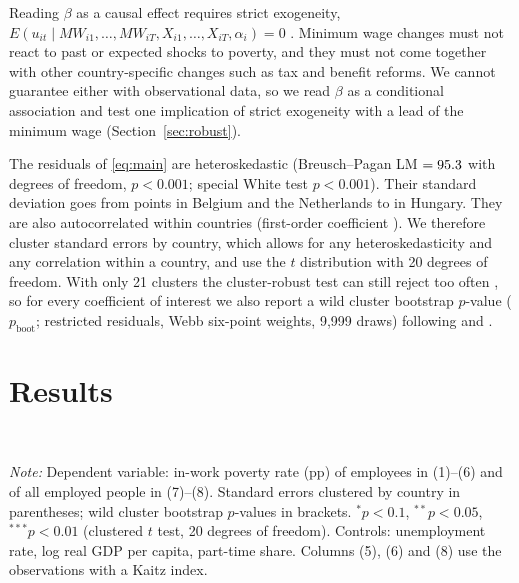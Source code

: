 \documentclass[10pt,a4paper]{article}
\newcommand{\pb}{p_{\text{boot}}}
\begin{document}
Reading $\beta$ as a causal effect requires strict exogeneity, $E(u_{it}\mid \mathit{MW}_{i1},\dots,\mathit{MW}_{iT}, X_{i1},\dots,X_{iT}, \alpha_i)=0$ \citep[ch.~13--14]{wooldridge2013}. Minimum wage changes must not react to past or expected shocks to poverty, and they must not come together with other country-specific changes such as tax and benefit reforms. We cannot guarantee either with observational data, so we read $\beta$ as a conditional association and test one implication of strict exogeneity with a lead of the minimum wage (Section~\ref{sec:robust}).

The residuals of \eqref{eq:main} are heteroskedastic (Breusch--Pagan LM $=95.3$ with \BpDf{} degrees of freedom, $p<0.001$; special White test $p<0.001$). Their standard deviation goes from \ResSdMin{} points in Belgium and the Netherlands to \ResSdMax{} in Hungary. They are also autocorrelated within countries (first-order coefficient \ArRho). We therefore cluster standard errors by country, which allows for any heteroskedasticity and any correlation within a country, and use the $t$ distribution with 20 degrees of freedom. With only 21 clusters the cluster-robust test can still reject too often \citep{cameron2015}, so for every coefficient of interest we also report a wild cluster bootstrap $p$-value ($\pb$; restricted residuals, Webb six-point weights, 9{,}999 draws) following \citet{cameron2008} and \citet{webb2023}.

\section{Results}

\begin{table}[t]
\centering\footnotesize
\caption{Minimum wage and in-work poverty: from pooled OLS to two-way fixed effects}\label{tab:main}
\setlength{\tabcolsep}{4.5pt}

\\[2pt]\parbox{0.96\textwidth}{\scriptsize\textit{Note:} Dependent variable: in-work poverty rate (pp) of employees in (1)--(6) and of all employed people in (7)--(8). Standard errors clustered by country in parentheses; wild cluster bootstrap $p$-values in brackets. $^{*}p<0.1$, $^{**}p<0.05$, $^{***}p<0.01$ (clustered $t$ test, 20 degrees of freedom). Controls: unemployment rate, log real GDP per capita, part-time share. Columns (5), (6) and (8) use the \NKaitz{} observations with a Kaitz index.}
\end{table}
\end{document}
